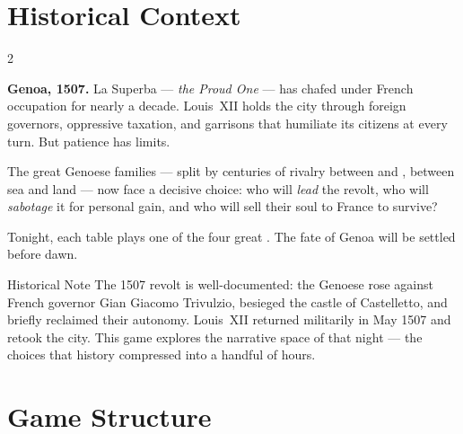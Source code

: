 
\chapter{Historical Context}
\label{ch:context}

\begin{multicols}{2}

\noindent\textbf{Genoa, 1507.} La Superba --- \textit{the Proud One} ---
has chafed under French occupation for nearly a decade.
Louis~XII holds the city through foreign governors, oppressive taxation,
and garrisons that humiliate its citizens at every turn. But patience has limits.

The great Genoese families --- split by centuries of rivalry between
 and , between sea and land --- now face
a decisive choice: who will \textit{lead} the revolt, who will \textit{sabotage}
it for personal gain, and who will sell their soul to France to survive?

Tonight, each table plays one of the four great .
The fate of Genoa will be settled before dawn.

\columnbreak

\begin{rulebox}{Historical Note}
The 1507 revolt is well-documented: the Genoese rose against French governor
Gian Giacomo Trivulzio, besieged the castle of Castelletto, and briefly
reclaimed their autonomy. Louis~XII returned militarily in May 1507 and
retook the city. This game explores the narrative space of that night ---
the choices that history compressed into a handful of hours.
\end{rulebox}

\end{multicols}

\chapter{Game Structure}
\label{ch:structure}

